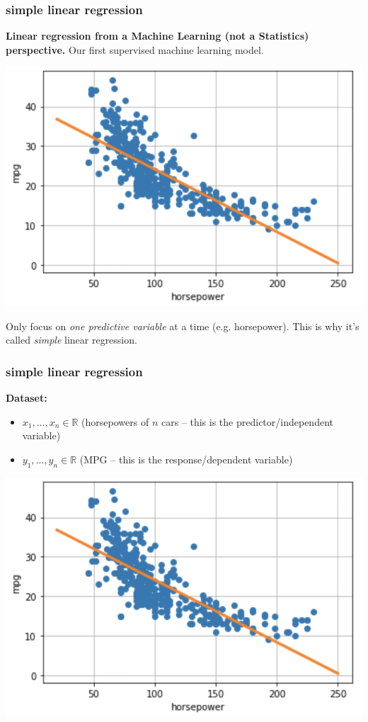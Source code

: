 \documentclass[handout,compress]{beamer}
\newcommand{\R}{\mathbb{R}}
\begin{document}
\begin{frame}
	\frametitle{simple linear regression}
	\textbf{Linear regression from a Machine Learning (not a Statistics) perspective.}
	Our first supervised machine learning model. 
	\begin{center}
		\includegraphics[width=.5\textwidth]{horsepower_fit.png}
		
		\vspace{-.5em}
		Only focus on \emph{one predictive variable} at a time (e.g. horsepower). 
		This is why it's called \emph{simple} linear regression.
	\end{center}
\end{frame}

\begin{frame}
	\frametitle{simple linear regression}
	\textbf{Dataset:} 
	\vspace{-.5em}
	\begin{itemize}
		\item $x_1, \ldots, x_n \in \R$ (horsepowers of $n$ cars -- this is the predictor/independent variable)
		\item $y_1, \ldots, y_n \in \R$ (MPG -- this is the response/dependent variable)
	\end{itemize}
	\begin{center}
		\includegraphics[width=.5\textwidth]{horsepower_fit.png}
	\end{center}
\end{frame}
\end{document}
